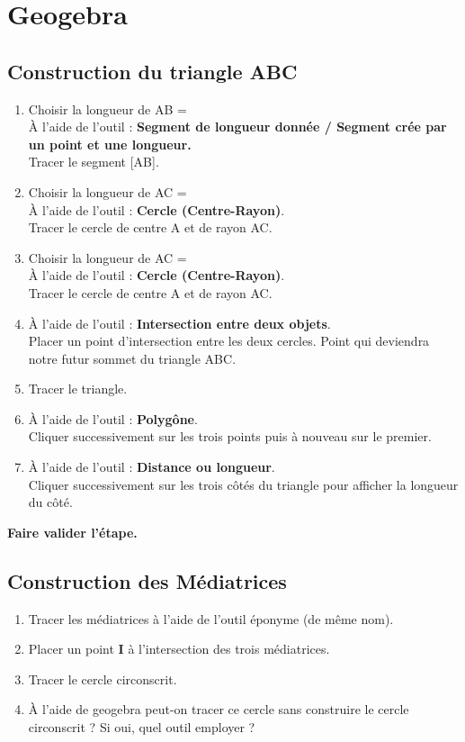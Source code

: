 \documentclass[11pt]{article}
\begin{document}
\section{Geogebra}

\subsection{Construction du triangle ABC}
\begin{enumerate}
\item Choisir la longueur de AB = \\
À l'aide de l'outil : \textbf{Segment de longueur donnée / Segment crée par un point et une longueur.}\\
Tracer le segment [AB].
\item Choisir la longueur de AC = \\
À l'aide de l'outil : \textbf{Cercle (Centre-Rayon)}.\\
Tracer le cercle de centre A et de rayon AC.
\item Choisir la longueur de AC = \\
À l'aide de l'outil : \textbf{Cercle (Centre-Rayon)}.\\
Tracer le cercle de centre A et de rayon AC.
\item À l'aide de l'outil : \textbf{Intersection entre deux objets}.\\
Placer un point d'intersection entre les deux cercles. Point qui deviendra notre futur sommet du triangle ABC.
\item Tracer le triangle.
\item À l'aide de l'outil : \textbf{Polygône}.\\
Cliquer successivement sur les trois points puis à nouveau sur le premier.
\item À l'aide de l'outil : \textbf{Distance ou longueur}.\\
Cliquer successivement sur les trois côtés du triangle pour afficher la longueur du côté.
\end{enumerate}
\textbf{Faire valider l'étape.}


\subsection{Construction des Médiatrices}
\begin{enumerate}
\item Tracer les médiatrices à l'aide de l'outil éponyme (de même nom).
\item Placer un point \textbf{I} à l'intersection des trois médiatrices.
\item Tracer le cercle circonscrit.
\item À l'aide de geogebra peut-on tracer ce cercle sans construire le cercle circonscrit ? Si oui, quel outil employer ?
\end{enumerate}
\end{document}
